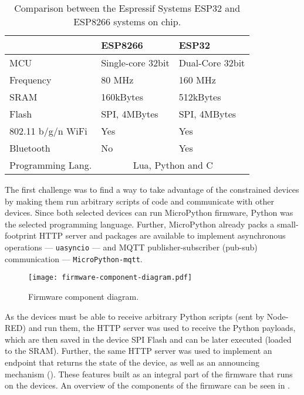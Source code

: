\begin{table}[]
\centering
\begin{tabular}{@{}lll@{}}
\toprule
                   & \textbf{ESP8266}                   & \textbf{ESP32}                       \\ \midrule
MCU                & Single-core 32bit         & Dual-Core 32bit \\
Frequency          & 80 MHz                    & 160 MHz                     \\
SRAM               & 160kBytes                 & 512kBytes                   \\
Flash              & SPI, 4MBytes             & SPI, 4MBytes               \\
802.11 b/g/n WiFi  & Yes                       & Yes                         \\
Bluetooth          & No                        & Yes                         \\
Programming Lang.  & \multicolumn{2}{c}{Lua, Python and C} \\ \bottomrule
\end{tabular}
\caption{Comparison between the Espressif Systems ESP32 and ESP8266 systems on chip.}
\label{tab:esps}
\end{table}

The first challenge was to find a way to take advantage of the constrained devices by making them run arbitrary scripts of code and communicate with other devices. Since both selected devices can run MicroPython firmware, Python was the selected programming language. Further, MicroPython already packs a small-footprint HTTP server and packages are available to implement asynchronous operations --- \ie \texttt{uasyncio} --- and MQTT publisher-subscriber (\viz pub-sub) communication --- \ie \texttt{MicroPython-mqtt}.

\begin{figure}[h]
    \centering
    \texttt{[image: firmware-component-diagram.pdf]}
    \caption{Firmware component diagram.}
    \label{fig:firmware_component_diagram}
\end{figure}

As the devices must be able to receive arbitrary Python scripts (sent by Node-RED) and run them, the HTTP server was used to receive the Python payloads, which are then saved in the device SPI Flash and can be later executed (loaded to the SRAM). Further, the same HTTP server was used to implement an endpoint that returns the state of the device, as well as an announcing mechanism (\cf {}). These features built as an integral part of the firmware that runs on the devices. An overview of the components of the firmware can be seen in .

